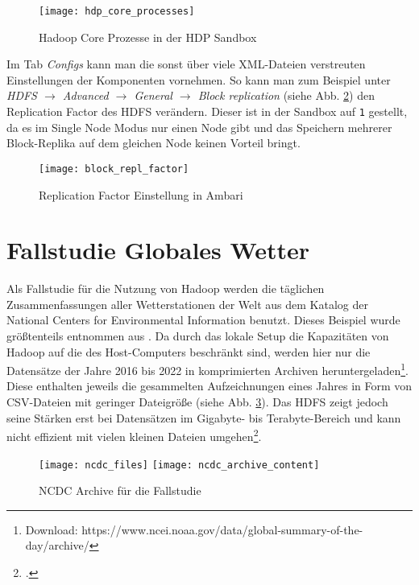 \begin{figure}[ht]
    \centering
    \texttt{[image: hdp\_core\_processes]}
    \caption[Hadoop Core Prozesse in der HDP Sandbox]{Hadoop Core Prozesse in der HDP Sandbox}
    \label{fig:hdp core processes}
\end{figure}

Im Tab \textit{Configs} kann man die sonst über viele XML-Dateien verstreuten Einstellungen der Komponenten vornehmen. So kann man zum Beispiel unter \textit{HDFS $\rightarrow$ Advanced $\rightarrow$ General $\rightarrow$ Block replication} (siehe Abb. \ref{fig:block replication factor}) den Replication Factor des HDFS verändern. Dieser ist in der Sandbox auf \verb|1| gestellt, da es im Single Node Modus nur einen Node gibt und das Speichern mehrerer Block-Replika auf dem gleichen Node keinen Vorteil bringt.  

\begin{figure}[ht]
    \centering
    \texttt{[image: block\_repl\_factor]}
    \caption[Replication Factor Einstellung in Ambari]{Replication Factor Einstellung in Ambari}
    \label{fig:block replication factor}
\end{figure}


\section{Fallstudie Globales Wetter}
Als Fallstudie für die Nutzung von Hadoop werden die täglichen Zusammenfassungen aller Wetterstationen der Welt aus dem Katalog der National Centers for Environmental Information\cite{docnoaanesdisncdc_global_2022} benutzt. Dieses Beispiel wurde größtenteils entnommen aus . Da durch das lokale Setup die Kapazitäten von Hadoop auf die des Host-Computers beschränkt sind, werden hier nur die Datensätze der Jahre 2016 bis 2022 in komprimierten Archiven heruntergeladen\footnote{Download: https://www.ncei.noaa.gov/data/global-summary-of-the-day/archive/}. Diese enthalten jeweils die gesammelten Aufzeichnungen eines Jahres in Form von CSV-Dateien mit geringer Dateigröße (siehe Abb. \ref{fig:ncdc files local}). Das HDFS zeigt jedoch seine Stärken erst bei Datensätzen im Gigabyte- bis Terabyte-Bereich und kann nicht effizient mit vielen kleinen Dateien umgehen\footcite[vgl.][Assumptions and Goals $\rightarrow$ Large Data Sets]{noauthor_apache_nodate-1}. 

\begin{figure}[ht]
    \centering
    \texttt{[image: ncdc\_files]}
    \texttt{[image: ncdc\_archive\_content]}
    \caption[NCDC Archive für die Fallstudie]{NCDC Archive für die Fallstudie}
    \label{fig:ncdc files local}
\end{figure}

